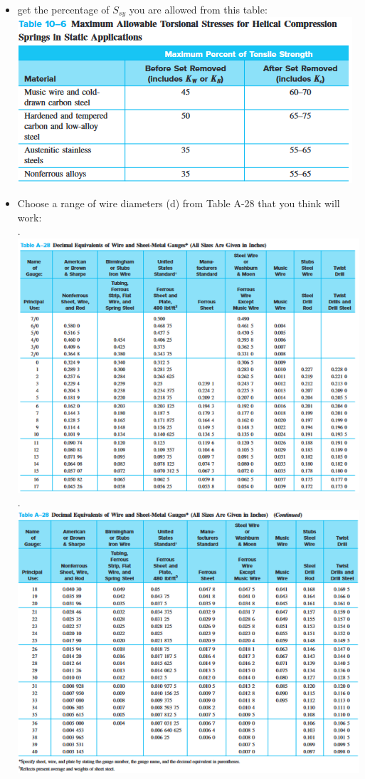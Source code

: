 \documentclass[11pt, fleqn]{article}
\begin{document}
\begin{itemize}
    \item get the percentage of $S_{sy}$ you are allowed from this table:\\
    \includegraphics[scale = 0.9]{Springs/Tab10-6.png}\\
    
    \item Choose a range of wire diameters (d) from Table A-28 that you think will work:\\
    .\hspace{-2cm}\includegraphics[scale = 0.9]{Springs/TabA-28.1.png}\\
    .\hspace{-2cm}\includegraphics[scale = 0.9]{Springs/TabA-28.2.png}\\


\end{itemize}
\end{document}
